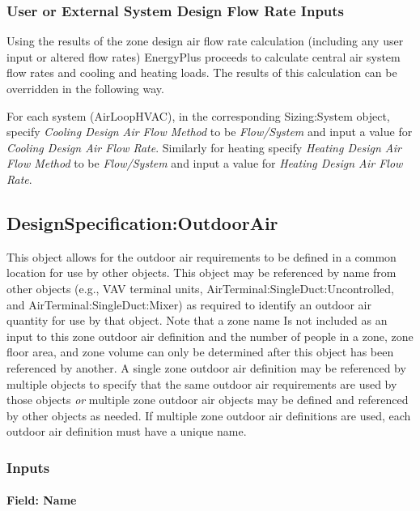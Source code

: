 \subsubsection{User or External System Design Flow Rate Inputs}\label{user-or-external-system-design-flow-rate-inputs}

Using the results of the zone design air flow rate calculation (including any user input or altered flow rates) EnergyPlus proceeds to calculate central air system flow rates and cooling and heating loads. The results of this calculation can be overridden in the following way.

For each system (AirLoopHVAC), in the corresponding Sizing:System object, specify \emph{Cooling Design Air Flow Method} to be \emph{Flow/System} and input a value for \emph{Cooling Design Air Flow Rate}. Similarly for heating specify \emph{Heating Design Air Flow Method} to be \emph{Flow/System} and input a value for \emph{Heating Design Air Flow Rate}.

\subsection{DesignSpecification:OutdoorAir}\label{designspecificationoutdoorair}

This object allows for the outdoor air requirements to be defined in a common location for use by other objects. This object may be referenced by name from other objects (e.g., VAV terminal units, AirTerminal:SingleDuct:Uncontrolled, and AirTerminal:SingleDuct:Mixer) as required to identify an outdoor air quantity for use by that object. Note that a zone name Is not included as an input to this zone outdoor air definition and the number of people in a zone, zone floor area, and zone volume can only be determined after this object has been referenced by another. A single zone outdoor air definition may be referenced by multiple objects to specify that the same outdoor air requirements are used by those objects \emph{or} multiple zone outdoor air objects may be defined and referenced by other objects as needed. If multiple zone outdoor air definitions are used, each outdoor air definition must have a unique name.

\subsubsection{Inputs}\label{inputs-012}

\paragraph{Field: Name}\label{field-name-011}

